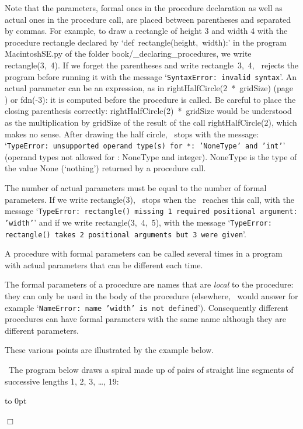 Note that the parameters, formal ones in the procedure declaration as well as actual ones
in the procedure call, are placed between parentheses and separated by
commas. For example, to draw a rectangle of height 3 and width 4 with the 
procedure {\idt rectangle} declared by `{\mcl def}\ {\idt rectangle(height,\ width):}' in the program
{\idt MacintoshSE.py} of the folder 
{\idt book/\_declaring\_procedures}, we write {\idt rectangle(3,\ 4)}.
If we forget the parentheses and write {\idt rectangle\ 3,\ 4}, \python\ rejects the program
before running it with the message `{\tt SyntaxError: invalid syntax}'.
An actual parameter can be an expression,
as in {\idt rightHalfCircle(2\ *\ gridSize)} (page \pageref{prog:HeliceEnCouleur})
or {\idt fdn(-3)}: it is computed before the procedure is called. Be careful to place
the closing parenthesis correctly: {\idt rightHalfCircle(2)\ *\ gridSize} would be
understood as the multiplication by {\idt gridSize} of the result of the call {\idt rightHalfCircle(2)}, 
which makes no sense. After drawing the half circle, \python\ stops with the message:
`{\tt TypeError: unsupported operand type(s) for *: 'NoneType' and 'int'}'
(operand types not allowed for {\idt *}: {\idt NoneType} and integer). {\idt NoneType} is the type
of the value {\mcl None} (`nothing') returned by a procedure call.

The number of actual parameters must be equal to the number of formal parameters.
If we write {\idt rectangle(3)}, \python\ stops when the \robot\ reaches this call,
with the message
`{\tt TypeError: rectangle() missing 1 required positional argument: 'width'}'
and if we write
{\idt rectangle(3,\ 4,\ 5)}, with the message
`{\tt TypeError: rectangle() takes 2 positional arguments but 3 were given}'.


A procedure with 
formal parameters can be called several times in a program with 
actual pa\-ram\-e\-ters
that can be different each time.

The formal parameters of a procedure are names that are {\em local} to the procedure: they can only be used in the
body of the procedure (elsewhere, \python\ would answer for example
`{\tt NameError: name 'width' is not defined}'). Consequently different procedures can have
formal parameters with the same name although they are different parameters. 

These various 
points are illustrated by the example below.

\noindent\begin{minipage}{\textwidth}
\begin{exemple}{\rm
~The program below draws a spiral made up of pairs of straight line segments
of successive lengths 1, 2, 3, \ldots, 19:

\nopagebreak
 {\raggedright 
 \mbox{}\hspace*{40mm}\vbox to 0pt{\vspace*{\baselineskip}\vspace*{4cm}
}
 
 }
\noindent $\Box$ }
\end{exemple}
\end{minipage}


